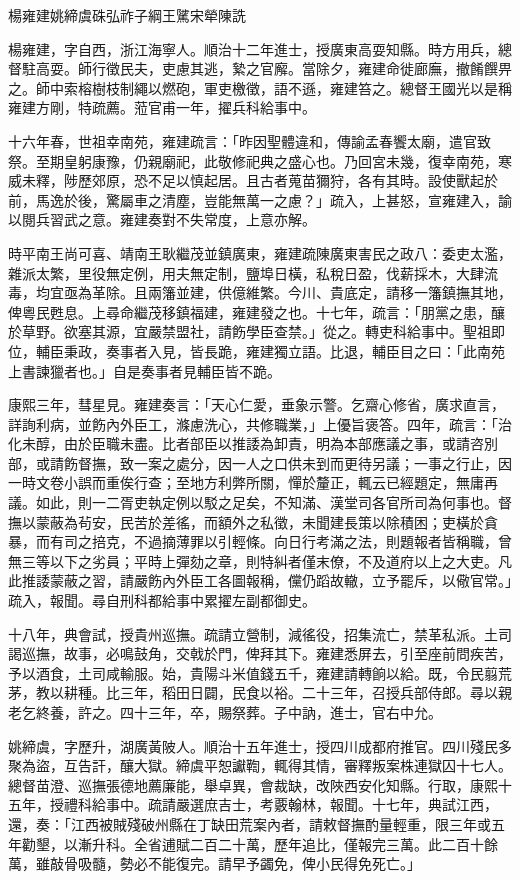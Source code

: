 
\begin{pinyinscope}
楊雍建姚締虞硃弘祚子綱王騭宋犖陳詵

楊雍建，字自西，浙江海寧人。順治十二年進士，授廣東高耍知縣。時方用兵，總督駐高耍。師行徵民夫，吏慮其逃，縶之官廨。當除夕，雍建命徙廊廡，撤餚饌畀之。師中索榕樹枝制繩以燃砲，軍吏檄徵，語不遜，雍建笞之。總督王國光以是稱雍建方剛，特疏薦。蒞官甫一年，擢兵科給事中。

十六年春，世祖幸南苑，雍建疏言：「昨因聖體違和，傳諭孟春饗太廟，遣官致祭。至期皇躬康豫，仍親廟祀，此敬修祀典之盛心也。乃回宮未幾，復幸南苑，寒威未釋，陟歷郊原，恐不足以慎起居。且古者蒐苗獮狩，各有其時。設使獸起於前，馬逸於後，驚屬車之清塵，豈能無萬一之慮？」疏入，上甚怒，宣雍建入，諭以閱兵習武之意。雍建奏對不失常度，上意亦解。

時平南王尚可喜、靖南王耿繼茂並鎮廣東，雍建疏陳廣東害民之政八：委吏太濫，雜派太繁，里役無定例，用夫無定制，鹽埠日橫，私稅日盈，伐薪採木，大肆流毒，均宜亟為革除。且兩籓並建，供億維繁。今川、貴底定，請移一籓鎮撫其地，俾粵民甦息。上尋命繼茂移鎮福建，雍建發之也。十七年，疏言：「朋黨之患，釀於草野。欲塞其源，宜嚴禁盟社，請飭學臣查禁。」從之。轉吏科給事中。聖祖即位，輔臣秉政，奏事者入見，皆長跪，雍建獨立語。比退，輔臣目之曰：「此南苑上書諫獵者也。」自是奏事者見輔臣皆不跪。

康熙三年，彗星見。雍建奏言：「天心仁愛，垂象示警。乞齋心修省，廣求直言，詳詢利病，並飭內外臣工，滌慮洗心，共修職業，」上優旨褒答。四年，疏言：「治化未醇，由於臣職未盡。比者部臣以推諉為卸責，明為本部應議之事，或請咨別部，或請飭督撫，致一案之處分，因一人之口供未到而更待另議；一事之行止，因一時文卷小誤而重俟行查；至地方利弊所關，憚於釐正，輒云已經題定，無庸再議。如此，則一二胥吏執定例以駁之足矣，不知滿、漢堂司各官所司為何事也。督撫以蒙蔽為茍安，民苦於差徭，而額外之私徵，未聞建長策以除積困；吏橫於貪暴，而有司之掊克，不過摘薄罪以引輕條。向日行考滿之法，則題報者皆稱職，曾無三等以下之劣員；平時上彈劾之章，則特糾者僅末僚，不及道府以上之大吏。凡此推諉蒙蔽之習，請嚴飭內外臣工各圖報稱，儻仍蹈故轍，立予罷斥，以儆官常。」疏入，報聞。尋自刑科都給事中累擢左副都御史。

十八年，典會試，授貴州巡撫。疏請立營制，減徭役，招集流亡，禁革私派。土司謁巡撫，故事，必鳴鼓角，交戟於門，俾拜其下。雍建悉屏去，引至座前問疾苦，予以酒食，土司咸輸服。始，貴陽斗米值錢五千，雍建請轉餉以給。既，令民翦荒茅，教以耕種。比三年，稻田日闢，民食以裕。二十三年，召授兵部侍郎。尋以親老乞終養，許之。四十三年，卒，賜祭葬。子中訥，進士，官右中允。

姚締虞，字歷升，湖廣黃陂人。順治十五年進士，授四川成都府推官。四川殘民多聚為盜，互告訐，釀大獄。締虞平恕讞鞫，輒得其情，審釋叛案株連獄囚十七人。總督苗澄、巡撫張德地薦廉能，舉卓異，會裁缺，改陜西安化知縣。行取，康熙十五年，授禮科給事中。疏請嚴選庶吉士，考覈翰林，報聞。十七年，典試江西，還，奏：「江西被賊殘破州縣在丁缺田荒案內者，請敕督撫酌量輕重，限三年或五年勸墾，以漸升科。全省逋賦二百二十萬，歷年追比，僅報完三萬。此二百十餘萬，雖敲骨吸髓，勢必不能復完。請早予蠲免，俾小民得免死亡。」


\end{pinyinscope}
